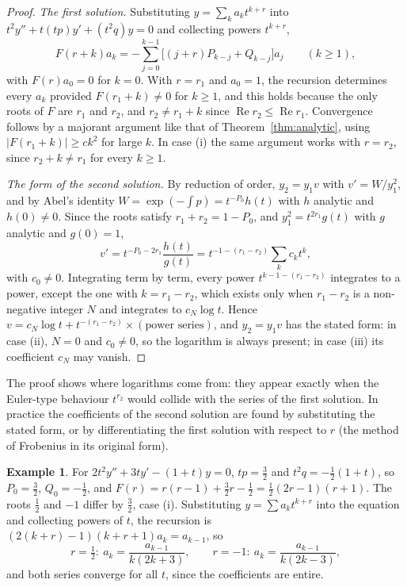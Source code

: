\documentclass[11pt,a4paper]{article}
\numberwithin{equation}{section}
\DeclareMathOperator{\Real}{Re}
\theoremstyle{definition}
\newtheorem{exa}[thm]{Example}
\begin{document}
\begin{proof}
\emph{The first solution.} Substituting $y = \sum_ka_kt^{k+r}$ into $t^2y'' + t(tp)y' + (t^2q)y = 0$ and collecting powers $t^{k+r}$,
\[
F(r + k)a_k = -\sum_{j=0}^{k-1}\bigl[(j + r)P_{k-j} + Q_{k-j}\bigr]a_j \qquad (k \geq 1),
\]
with $F(r)a_0 = 0$ for $k = 0$. With $r = r_1$ and $a_0 = 1$, the recursion determines every $a_k$ provided $F(r_1 + k) \neq 0$ for $k \geq 1$, and this holds because the only roots of $F$ are $r_1$ and $r_2$,
and $r_2 \neq r_1 + k$ since $\Real r_2 \leq \Real r_1$. Convergence follows by a majorant argument like that of Theorem~\ref{thm:analytic}, using $|F(r_1 + k)| \geq ck^2$ for large $k$. In case (i) the same
argument works with $r = r_2$, since $r_2 + k \neq r_1$ for every $k \geq 1$.

\emph{The form of the second solution.} By reduction of order, $y_2 = y_1v$ with $v' = W/y_1^2$, and by Abel's identity $W = \exp(-\int p) = t^{-P_0}h(t)$ with $h$ analytic and $h(0) \neq 0$. Since the roots satisfy
$r_1 + r_2 = 1 - P_0$, and $y_1^2 = t^{2r_1}g(t)$ with $g$ analytic and $g(0) = 1$,
\[
v' = t^{-P_0 - 2r_1}\frac{h(t)}{g(t)} = t^{-1-(r_1 - r_2)}\sum_kc_kt^k ,
\]
with $c_0 \neq 0$. Integrating term by term, every power $t^{k - 1 - (r_1 - r_2)}$ integrates to a power, except the one with $k = r_1 - r_2$, which exists only when $r_1 - r_2$ is a non-negative integer $N$ and
integrates to $c_N\log t$. Hence $v = c_N\log t + t^{-(r_1 - r_2)}\times(\text{power series})$, and $y_2 = y_1v$ has the stated form: in case (ii), $N = 0$ and $c_0 \neq 0$, so the logarithm is always present;
in case (iii) its coefficient $c_N$ may vanish.
\end{proof}

The proof shows where logarithms come from: they appear exactly when the Euler-type behaviour $t^{r_2}$ would collide with the series of the first solution. In practice the coefficients of the
second solution are found by substituting the stated form, or by differentiating the first solution with respect to $r$ (the method of Frobenius in its original form).

\begin{exa}
\label{ex:frob}
For $2t^2y'' + 3ty' - (1 + t)y = 0$, $tp = \frac32$ and $t^2q = -\frac12(1 + t)$, so $P_0 = \frac32$, $Q_0 = -\frac12$, and $F(r) = r(r - 1) + \frac32r - \frac12 = \frac12(2r - 1)(r + 1)$. The roots $\frac12$ and $-1$ differ by $\frac32$, case
(i). Substituting $y = \sum a_kt^{k+r}$ into the equation and collecting powers of $t$, the recursion is $(2(k + r) - 1)(k + r + 1)a_k = a_{k-1}$, so
\[
r = \tfrac12:\ a_k = \frac{a_{k-1}}{k(2k + 3)}, \qquad r = -1:\ a_k = \frac{a_{k-1}}{k(2k - 3)} ,
\]
and both series converge for all $t$, since the coefficients are entire.
\end{exa}
\end{document}
